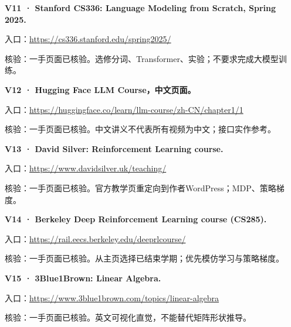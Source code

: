 \par\noindent\begin{minipage}{\linewidth}
\textbf{V11 · Stanford CS336: Language Modeling from Scratch, Spring
2025.}

入口：\url{https://cs336.stanford.edu/spring2025/}

核验：一手页面已核验。选修分词、Transformer、实验；不要求完成大模型训练。
\end{minipage}\par\vspace{6pt}

\par\noindent\begin{minipage}{\linewidth}
\textbf{V12 · Hugging Face LLM Course，中文页面。}

入口：\url{https://huggingface.co/learn/llm-course/zh-CN/chapter1/1}

核验：一手页面已核验。中文讲义不代表所有视频为中文；接口实作参考。
\end{minipage}\par\vspace{6pt}

\par\noindent\begin{minipage}{\linewidth}
\textbf{V13 · David Silver: Reinforcement Learning course.}

入口：\url{https://www.davidsilver.uk/teaching/}

核验：一手页面已核验。官方教学页重定向到作者WordPress；MDP、策略梯度。
\end{minipage}\par\vspace{6pt}

\par\noindent\begin{minipage}{\linewidth}
\textbf{V14 · Berkeley Deep Reinforcement Learning course (CS285).}

入口：\url{https://rail.eecs.berkeley.edu/deeprlcourse/}

核验：一手页面已核验。从主页选择已结束学期；优先模仿学习与策略梯度。
\end{minipage}\par\vspace{6pt}

\par\noindent\begin{minipage}{\linewidth}
\textbf{V15 · 3Blue1Brown: Linear Algebra.}

入口：\url{https://www.3blue1brown.com/topics/linear-algebra}

核验：一手页面已核验。英文可视化直觉，不能替代矩阵形状推导。
\end{minipage}\par\vspace{6pt}

